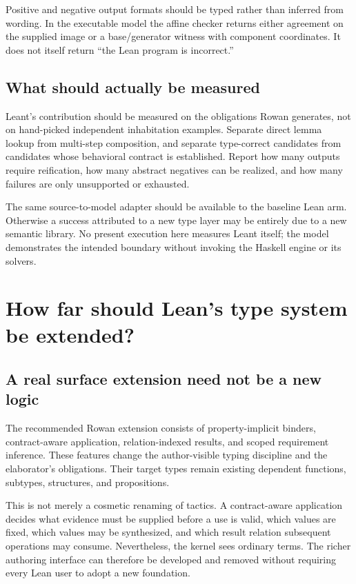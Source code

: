 \documentclass[11pt,letterpaper]{article}
\theoremstyle{definition}\newtheorem{definition}[theorem]{Definition}
\theoremstyle{remark}\newtheorem{remark}[theorem]{Remark}
\begin{document}
Positive and negative output formats should be typed rather than inferred
from wording. In the executable model the affine checker returns either
agreement on the supplied image or a base/generator witness with component
coordinates. It does not itself return ``the Lean program is incorrect.''

\subsection{What should actually be measured}
Leant's contribution should be measured on the obligations Rowan generates,
not on hand-picked independent inhabitation examples. Separate direct lemma
lookup from multi-step composition, and separate type-correct candidates from
candidates whose behavioral contract is established. Report how many outputs
require reification, how many abstract negatives can be realized, and how
many failures are only unsupported or exhausted.

The same source-to-model adapter should be available to the baseline Lean
arm. Otherwise a success attributed to a new type layer may be entirely due
to a new semantic library. No present execution here measures Leant itself;
the model demonstrates the intended boundary without invoking the Haskell
engine or its solvers.

\section{How far should Lean's type system be extended?}
\label{sec:kernel}

\subsection{A real surface extension need not be a new logic}
The recommended Rowan extension consists of property-implicit binders,
contract-aware application, relation-indexed results, and scoped requirement
inference. These features change the author-visible typing discipline and
the elaborator's obligations. Their target types remain existing dependent
functions, subtypes, structures, and propositions.

This is not merely a cosmetic renaming of tactics. A contract-aware
application decides what evidence must be supplied before a use is valid,
which values are fixed, which values may be synthesized, and which result
relation subsequent operations may consume. Nevertheless, the kernel sees
ordinary terms. The richer authoring interface can therefore be developed
and removed without requiring every Lean user to adopt a new foundation.
\end{document}
